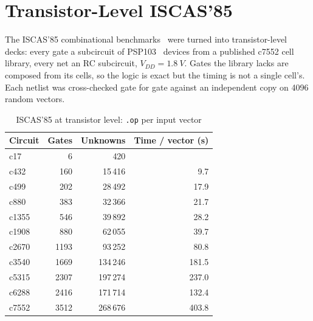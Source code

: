 \section{Transistor-Level ISCAS'85}
\label{sec:scale}

The ISCAS'85 combinational benchmarks~\cite{brglez1985iscas} were turned into transistor-level
decks: every gate a subcircuit of PSP103~\cite{gildenblat2006psp} devices from a published
c7552 cell library, every net an RC subcircuit, $V_{DD}=\SI{1.8}{V}$. Gates the library lacks
are composed from its cells, so the logic is exact but the timing is not a single cell's. Each
netlist was cross-checked gate for gate against an independent copy on \num{4096} random
vectors. 

\begin{table}[t]
  \centering
  \caption{ISCAS'85 at transistor level: \texttt{.op} per input vector
  }
  \label{tab:iscas}
  \begin{tabular}{@{}lrrr@{}}
    \toprule
    Circuit & Gates & Unknowns & Time / vector (s) \\
    \midrule
    c17   &    6 &     420 & \todo{} \\
    c432  &  160 &  15\,416 &   9.7 \\
    c499  &  202 &  28\,492 &  17.9 \\
    c880  &  383 &  32\,366 &  21.7 \\
    c1355 &  546 &  39\,892 &  28.2 \\
    c1908 &  880 &  62\,055 &  39.7 \\
    c2670 & 1193 &  93\,252 &  80.8 \\
    c3540 & 1669 & 134\,246 & 181.5 \\
    c5315 & 2307 & 197\,274 & 237.0 \\
    c6288 & 2416 & 171\,714 & 132.4 \\
    c7552 & 3512 & 268\,676 & 403.8 \\
    \bottomrule
  \end{tabular}
\end{table}



